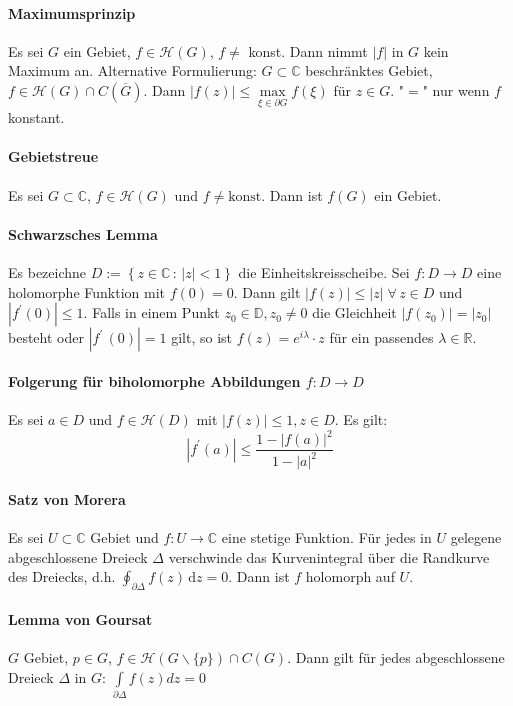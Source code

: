 \documentclass[a4paper, 10pt, DIV20, headings=small]{scrartcl}
\theoremstyle{definition}
\theoremstyle{plain}
\begin{document}
\paragraph{Maximumsprinzip}
Es sei $G$ ein Gebiet, $f \in \mathcal{H}(G)$, $f \neq$ konst. Dann nimmt $|f|$ in $G$ kein Maximum an.
Alternative Formulierung: 
$G \subset \mathbb{C}$ beschränktes Gebiet, $f \in \mathcal{H}(G) \cap C(\overline{G})$. Dann $|f(z)| \leq \max\limits_{\xi \in \partial G} f(\xi)$ für $z \in G$. "$=$" nur wenn $f$ konstant.

\paragraph{Gebietstreue}
Es sei $G \subset \mathbb{C}$, $f \in \mathcal{H}(G)$ und $f \neq \text{konst}$. Dann ist $f(G)$ ein Gebiet.

\paragraph{Schwarzsches Lemma}
Es bezeichne $D := \left\{z \in \mathbb{C} \,:\, |z| < 1 \right\}$ die Einheitskreisscheibe. Sei $f \colon D \to D$ eine holomorphe Funktion mit $f(0) = 0$. Dann gilt $|f(z)| \leq |z| \; \forall \, z \in D$ und $|f^\prime(0)|\leq 1$. Falls in einem Punkt $z_0 \in \mathbb{D}, z_0 \neq 0$ die Gleichheit $|f(z_0)| = |z_0|$ besteht oder $|f^\prime\!\,(0)| = 1$ gilt, so ist $f(z) = e^{i \lambda} \cdot z$ für ein passendes $\lambda \in \mathbb{R}$.

\paragraph{Folgerung für biholomorphe Abbildungen $f \colon D \rightarrow D$}
Es sei $a \in D$ und $f \in \mathcal{H}(D)$ mit $|f(z)| \leq 1, z \in D$. Es gilt:
$$|f^\prime(a)| \leq \frac{1 - |f(a)|^2}{1 - |a|^2}$$

\paragraph{Satz von Morera}
Es sei $U \subset \mathbb{C}$ Gebiet und $f \colon U \rightarrow \mathbb{C}$ eine stetige Funktion. Für jedes in $U$ gelegene abgeschlossene Dreieck $\Delta$ verschwinde das Kurvenintegral über die Randkurve des Dreiecks, d.h. $\oint_{\partial\Delta} f(z)\, \mathrm{d}z = 0$. Dann ist $f$ holomorph auf $U$.

\paragraph{Lemma von Goursat}
$G$ Gebiet, $p \in G$, $f \in \mathcal{H}(G \backslash\{p\}) \cap C(G)$. Dann gilt für jedes abgeschlossene Dreieck $\Delta$ in $G$:
$\int\limits_{\partial \Delta}{f(z)dz} = 0$
\end{document}
